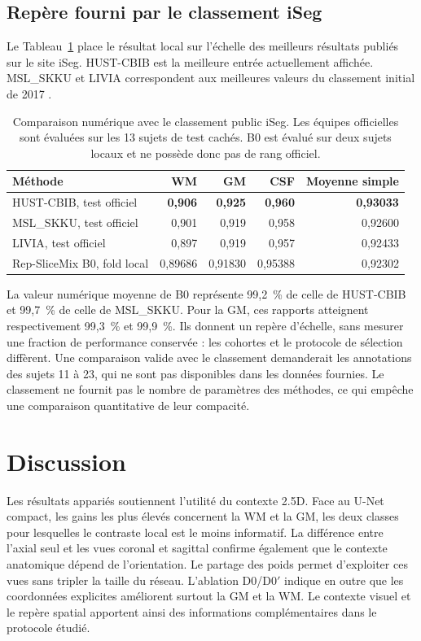 \documentclass[11pt,a4paper]{article}
\begin{document}
\subsection{Repère fourni par le classement iSeg}

Le Tableau~\ref{tab:leaderboard} place le résultat local sur l'échelle des
meilleurs résultats publiés sur le site iSeg. HUST-CBIB est la meilleure entrée
actuellement affichée. MSL\_SKKU et LIVIA correspondent aux meilleures valeurs
du classement initial de 2017 \cite{isegresults}.

\begin{table}[htbp]
\centering
\small
\caption{Comparaison numérique avec le classement public iSeg. Les équipes
officielles sont évaluées sur les 13 sujets de test cachés. B0 est évalué sur
deux sujets locaux et ne possède donc pas de rang officiel.}
\label{tab:leaderboard}
\begin{tabular}{@{}lrrrr@{}}
\toprule
Méthode & WM & GM & CSF & Moyenne simple \\
\midrule
HUST-CBIB, test officiel & \textbf{0,906} & \textbf{0,925} & \textbf{0,960} & \textbf{0,93033} \\
MSL\_SKKU, test officiel & 0,901 & 0,919 & 0,958 & 0,92600 \\
LIVIA, test officiel & 0,897 & 0,919 & 0,957 & 0,92433 \\
Rep-SliceMix B0, fold local & 0,89686 & 0,91830 & 0,95388 & 0,92302 \\
\bottomrule
\end{tabular}
\end{table}

La valeur numérique moyenne de B0 représente 99,2~\% de celle de HUST-CBIB et
99,7~\% de celle de MSL\_SKKU. Pour la GM, ces rapports atteignent respectivement
99,3~\% et 99,9~\%. Ils donnent un repère d'échelle, sans mesurer une fraction de
performance conservée : les cohortes et le protocole de sélection diffèrent.
Une comparaison valide avec le classement demanderait les annotations des
sujets 11 à 23, qui ne sont pas disponibles dans les données fournies. Le
classement ne fournit pas le nombre de paramètres des méthodes, ce qui empêche
une comparaison quantitative de leur compacité.

\section{Discussion}

Les résultats appariés soutiennent l'utilité du contexte 2.5D. Face au U-Net
compact, les gains les plus élevés concernent la WM et la GM, les deux classes
pour lesquelles le contraste local est le moins informatif. La différence entre
l'axial seul et les vues coronal et sagittal confirme également que le contexte
anatomique dépend de l'orientation. Le partage des poids permet d'exploiter ces
vues sans tripler la taille du réseau. L'ablation D0/D0$'$ indique en outre que
les coordonnées explicites améliorent surtout la GM et la WM. Le contexte
visuel et le repère spatial apportent ainsi des informations complémentaires
dans le protocole étudié.
\end{document}
